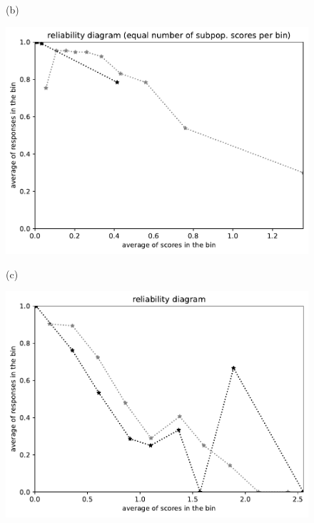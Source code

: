 \documentclass{article}
\newlength{\vertsep}
\newlength{\imsize}
\begin{document}
\begin{figure}
\begin{centering}
(b)
\parbox{\imsize}{\includegraphics[width=\imsize]
{../codes/unweighted/nll-1-323-monarch-monarch-butterfly-milkweed-butterfly-Danaus-plexippus_342-wild-boar-boar-Sus-scrofaequisamps10.pdf}}
\quad\quad
(c)
\parbox{\imsize}{\includegraphics[width=\imsize]
{../codes/unweighted/nll-1-323-monarch-monarch-butterfly-milkweed-butterfly-Danaus-plexippus_342-wild-boar-boar-Sus-scrofaequiscore10.pdf}}

\vspace{\vertsep}


\end{centering}
\end{figure}
\end{document}
